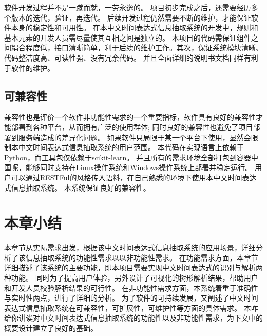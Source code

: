 软件开发过程并不是一蹴而就，一劳永逸的。 项目初步完成之后，还需要经历多个版本的迭代，验证，再迭代。 
后续开发过程仍然需要不断的维护，才能保证软件本身的稳定性和可用性。
在本中文时间表达式信息抽取系统的开发中，规则和基本元素的开发人员需尽量使其互相之间是独立的。
本项目的代码需保证组件之间耦合程度低，接口清晰简单，利于后续的维护工作。其次，保证系统模块清晰、代码整洁度高、可读性强、没有冗余代码。
并且全面详细的说明书文档同样有利于软件的维护。

\subsection{可兼容性}

兼容性也是评价一个软件非功能性需求的一个重要指标，软件具有良好的兼容性才能部署到各种平台，从而拥有广泛的使用群体; 同时良好的兼容性也避免了项目部署到服务端造成的差异化问题。
如果软件只局限于某一个平台下使用，显然会限制本中文时间表达式信息抽取系统的用户范围。 本代码在实现语言上依赖于Python，而工具包仅依赖于scikit-learn。 
并且所有的需求环境全部打包到容器中国呢，能够同时支持在Linux操作系统和Windows操作系统上部署并稳定运行。 
用户可以通过RESTFul的风格传入语料，在自己熟悉的环境下使用本中文时间表达式信息抽取系统。 本系统保证良好的兼容性。

\section{本章小结}

本章节从实际需求出发，根据该中文时间表达式信息抽取系统的应用场景，详细分析了该信息抽取系统的功能性需求以以非功能性需求。
在功能需求方面，本章节详细描述了该系统的主要功能，即本项目需要实现中文时间表达式的识别与解析两种功能。 
同时为了提高用户体验，另外设计了可视化的树形解析结果，帮助用户和开发人员校验解析结果的可行性。
在非功能性需求方面，本系统着重于准确性与实时性两点，进行了详细的分析。 
为了软件的可持续发展，又阐述了中文时间表达式信息抽取系统在可兼容性，可扩展性，可维护性等方面的具体需求。
本咋给你讲诶对中文时间表达式信息抽取系统的功能性以及非功能性需求，为下文中的概要设计建立了良好的基础。

